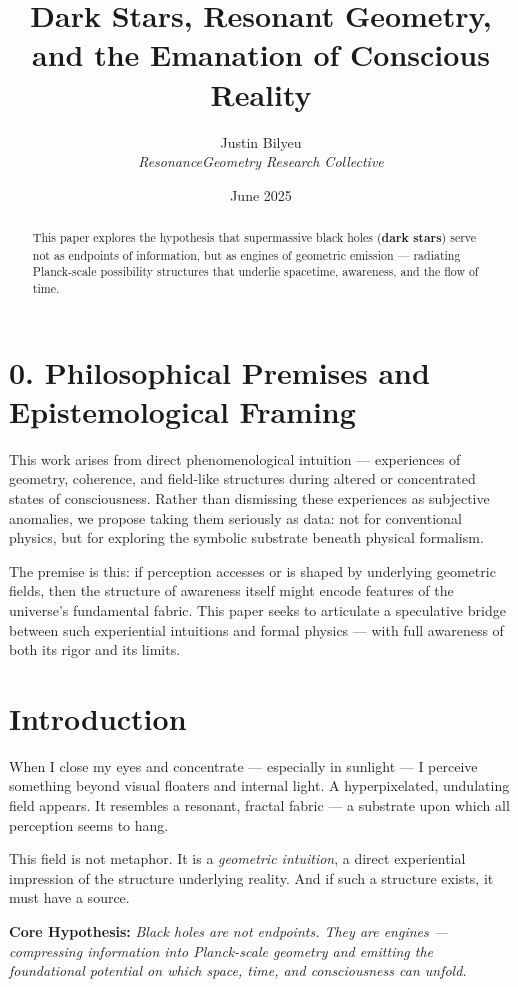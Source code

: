 \documentclass[12pt]{article}
\title{\textbf{Dark Stars, Resonant Geometry, and the Emanation of Conscious Reality}}
\author{Justin Bilyeu \\ \small \textit{ResonanceGeometry Research Collective}}
\date{June 2025}
\begin{document}
\maketitle

\begin{abstract}
This paper explores the hypothesis that supermassive black holes (\textbf{dark stars}) serve not as endpoints of information, but as engines of geometric emission — radiating Planck-scale possibility structures that underlie spacetime, awareness, and the flow of time.
\end{abstract}

\section*{0. Philosophical Premises and Epistemological Framing}
This work arises from direct phenomenological intuition — experiences of geometry, coherence, and field-like structures during altered or concentrated states of consciousness. Rather than dismissing these experiences as subjective anomalies, we propose taking them seriously as data: not for conventional physics, but for exploring the symbolic substrate beneath physical formalism.

The premise is this: if perception accesses or is shaped by underlying geometric fields, then the structure of awareness itself might encode features of the universe's fundamental fabric. This paper seeks to articulate a speculative bridge between such experiential intuitions and formal physics — with full awareness of both its rigor and its limits.

\section{Introduction}
When I close my eyes and concentrate — especially in sunlight — I perceive something beyond visual floaters and internal light. A hyperpixelated, undulating field appears. It resembles a resonant, fractal fabric — a substrate upon which all perception seems to hang.

This field is not metaphor. It is a \emph{geometric intuition}, a direct experiential impression of the structure underlying reality. And if such a structure exists, it must have a source.

\vspace{1em}
\noindent\textbf{Core Hypothesis:} \emph{Black holes are not endpoints. They are engines — compressing information into Planck-scale geometry and emitting the foundational potential on which space, time, and consciousness can unfold.}
\end{document}
